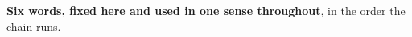 \documentclass{article}
\begin{document}
\noindent \textbf{Six words, fixed here and used in one sense throughout}, in the order the chain runs.
\end{document}
